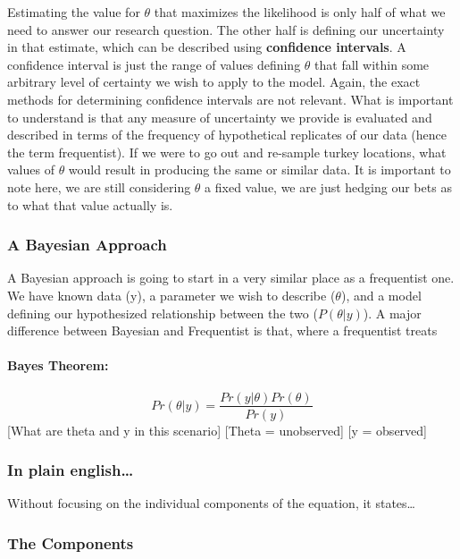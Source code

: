 \documentclass[
]{article}
\begin{document}
Estimating the value for \(\theta\) that maximizes the likelihood is
only half of what we need to answer our research question. The other
half is defining our uncertainty in that estimate, which can be
described using \textbf{confidence intervals}. A confidence interval is
just the range of values defining \(\theta\) that fall within some
arbitrary level of certainty we wish to apply to the model. Again, the
exact methods for determining confidence intervals are not relevant.
What is important to understand is that any measure of uncertainty we
provide is evaluated and described in terms of the frequency of
hypothetical replicates of our data (hence the term frequentist). If we
were to go out and re-sample turkey locations, what values of \(\theta\)
would result in producing the same or similar data. It is important to
note here, we are still considering \(\theta\) a fixed value, we are
just hedging our bets as to what that value actually is.

\hypertarget{a-bayesian-approach}{%
\subsubsection{A Bayesian Approach}\label{a-bayesian-approach}}

A Bayesian approach is going to start in a very similar place as a
frequentist one. We have known data (y), a parameter we wish to describe
(\(\theta\)), and a model defining our hypothesized relationship between
the two (\(P(\theta|y)\)). A major difference between Bayesian and
Frequentist is that, where a frequentist treats

\hypertarget{bayes-theorem}{%
\paragraph{Bayes Theorem:}\label{bayes-theorem}}

\[ Pr(\theta|y) = \frac{Pr(y|\theta) Pr(\theta)}{Pr(y)}\] {[}What are
theta and y in this scenario{]} {[}Theta = unobserved{]} {[}y =
observed{]}

\hypertarget{in-plain-english}{%
\subsubsection{In plain english\ldots{}}\label{in-plain-english}}

Without focusing on the individual components of the equation, it
states\ldots{}

\hypertarget{the-components}{%
\subsubsection{The Components}\label{the-components}}
\end{document}
